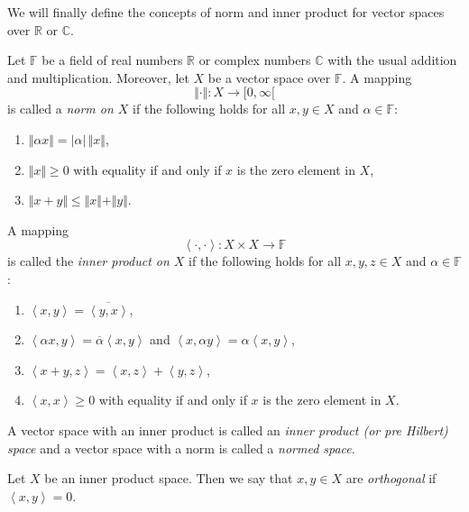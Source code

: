 \documentclass[a4paper]{paper}
\newcommand{\Field}{\mathbb{F}}
\newcommand{\Real}{\mathbb{R}}
\newcommand{\Complex}{\mathbb{C}}
\newcommand{\ip}[2]{\left \langle #1,#2 \right\rangle}
\begin{document}
We will finally define the concepts of norm and inner product for vector spaces over $\Real$ 
or $\Complex$. 
\begin{definition}
  Let $\Field$ be a field of real numbers $\Real$ or complex numbers $\Complex$  with the usual 
  addition and multiplication. Moreover, let $X$ be a vector space over $\Field$. A mapping 
  \[ \Vert \cdot \Vert \colon X \to [0,\infty[ \]
  is called a \emph{norm on $X$} if the following holds for all $x,y \in X$ and $\alpha\in\Field$:
  \begin{enumerate}
  \item $\Vert \alpha x \Vert = \vert \alpha \vert \, \Vert x \Vert$,
  \item $\Vert x \Vert \geq 0$ with equality if and only if $x$ is the zero element in $X$,
  \item $\Vert x+y \Vert \leq \Vert x \Vert+\Vert y \Vert$.
  \end{enumerate}
  A mapping 
  \[ \ip{\cdot}{\cdot} \colon X\times X \to \Field \]
  is called the \emph{inner product on $X$}
  if the following holds for all $x,y,z \in X$ and $\alpha\in\Field$:
  \begin{enumerate}
  \item $\ip{x}{y}=\overline{\ip{y}{x}}$,
  \item $\ip{\alpha x}{y}=\overline{\alpha}\ip{x}{y}$ and $\ip{x}{\alpha  y}= \alpha \ip{x}{y}$,
  \item $\ip{x + y}{z} = \ip{x}{z}  +  \ip{y}{z}$,
  \item  $\ip{x}{x}\geq 0$ with equality if and only if $x$ is the zero element in $X$.
  \end{enumerate}
  A vector space with an inner product is called an \emph{inner product (or pre Hilbert) space}
  and a vector space with a norm is called a \emph{normed space}.
\end{definition}
Let $X$ be an inner product space. Then we say that $x,y \in X$ are \emph{orthogonal} 
if $\ip{x}{y}=0$. 
\end{document}
